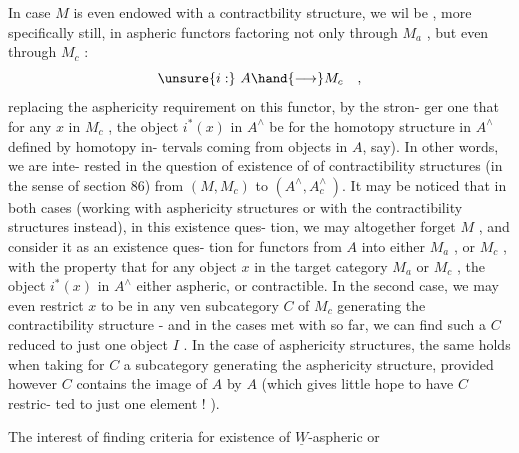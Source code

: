 In case  $M$ is even endowed with a contractbility structure,  we wil
be , more specifically still,  in aspheric functors factoring not only
through $M_a$ ,  but even through $M_c$ :
\[ \unsure{i:}\ A \hand{\longrightarrow} M_c \quad , \]
 replacing the asphericity requirement on this functor,  by the stron-%
ger one that for  any $x$ in $M_c$ ,  the object $i^*(x)$ in $A^\wedge$ be \hand{\uline{\textcolor{black}{contractible}}}
\hand{(}for the homotopy structure in $A^\wedge$  defined by homotopy in-%
tervals coming from objects in $A$,  say).  In other words,  we are inte-%
rested in the question of existence of \hand{\uline{\textcolor{black}{bimorphisms}}}  of contractibility
structures  (in the sense of section 86)  from $(M,M_c)$  to  $(A^\wedge,A^\wedge_c\ )$.
It may be noticed that in both cases (working with asphericity structures
or with the contractibility structures instead),  in this existence ques-%
tion,  we may altogether forget $M$ ,  and consider it as an existence ques-%
tion for functors from $A$ into either $M_a$  ,  or $M_c$ ,  with the property
that for any object $x$ in the target category $M_a$ or $M_c$ ,  the object
$i^*(x)$  in $A^\wedge$  either aspheric,  or contractible.  In the  second
case,  we may even restrict $x$ to be in any ven subcategory $C$ of $M_c$
generating the contractibility structure  -  and in the cases met with so
far,  we can find such a $C$ reduced to just one object  $I$ .  In the case
of asphericity structures,   the same holds when taking for $C$ a
subcategory generating the asphericity structure,  provided however $C$
contains the image of $A$ by $A$  (which gives little hope to have $C$ restric-%
ted to just one element ! ).

The interest of finding criteria for existence of $\underline{W}$-aspheric or

